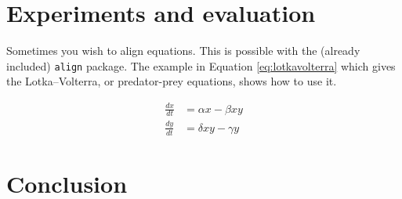 \documentclass[10pt,a4paper,twoside,journal]{IEEEtran}
\begin{document}
\section{Experiments and evaluation}
\label{sc:evaluation}


Sometimes you wish to align equations. This is possible with the (already
included) \texttt{align} package. The example in Equation \autoref{eq:lotkavolterra}
which gives the Lotka--Volterra, or predator-prey equations, shows how to use
it.

\begin{align}\label{eq:lotkavolterra}
	\frac{dx}{dt} &= \alpha x - \beta x y \\
	\frac{dy}{dt} &= \delta x y - \gamma y
\end{align}

\section{Conclusion}
\label{sc:conclusion}




\end{document}
